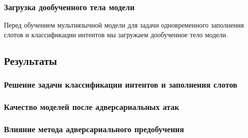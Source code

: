 
\subsubsection{Загрузка дообученного тела модели}
Перед обучением мультиязычной модели для задачи одновременного заполнения слотов и классификации интентов мы загружаем дообученное тело модели.

\subsection{Результаты}

\subsubsection{Решение задачи классификации интентов и заполнения слотов}




\subsubsection{Качество моделей после адверсариальных атак}





\subsubsection{Влияние метода адверсариального предобучения}





